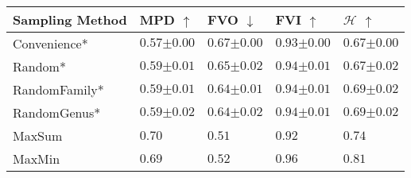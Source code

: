 \begin{tabular}{lllll}
	\toprule
	\textbf{Sampling Method} & \textbf{MPD} $\uparrow$           & \textbf{FVO} $\downarrow$         & \textbf{FVI} $\uparrow$           & $\boldsymbol{\mathcal{H}}$ $\uparrow$ \\\midrule
	Convenience*             & $0.57 {\scriptscriptstyle\pm0.00}$ & $0.67 {\scriptscriptstyle\pm0.00}$ & $0.93 {\scriptscriptstyle\pm0.00}$ & $0.67 {\scriptscriptstyle\pm0.00}$     \\
	Random*                  & $0.59 {\scriptscriptstyle\pm0.01}$ & $0.65 {\scriptscriptstyle\pm0.02}$ & $0.94 {\scriptscriptstyle\pm0.01}$ & $0.67 {\scriptscriptstyle\pm0.02}$     \\
	RandomFamily*            & $0.59 {\scriptscriptstyle\pm0.01}$ & $0.64 {\scriptscriptstyle\pm0.01}$ & $0.94 {\scriptscriptstyle\pm0.01}$ & $0.69 {\scriptscriptstyle\pm0.02}$     \\
	RandomGenus*             & $0.59 {\scriptscriptstyle\pm0.02}$ & $0.64 {\scriptscriptstyle\pm0.02}$ & $0.94 {\scriptscriptstyle\pm0.01}$ & $0.69 {\scriptscriptstyle\pm0.02}$     \\\midrule
	MaxSum                   & $\mathbf{0.70}$                   & $\mathbf{0.51}$                   & $0.92$                            & $0.74$                                \\
	MaxMin                   & $0.69$                            & $0.52$                            & $\mathbf{0.96}$                   & $\mathbf{0.81}$                       \\\bottomrule
\end{tabular}